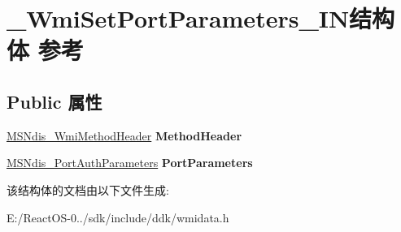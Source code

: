 \hypertarget{struct___wmi_set_port_parameters___i_n}{}\section{\+\_\+\+Wmi\+Set\+Port\+Parameters\+\_\+\+I\+N结构体 参考}
\label{struct___wmi_set_port_parameters___i_n}
\subsection*{Public 属性}
\begin{DoxyCompactItemize}
\item 
\mbox{\label{struct___wmi_set_port_parameters___i_n_a1abd5f32d794908f6052f43262f846f6}} 
\hyperlink{struct___m_s_ndis___wmi_method_header}{M\+S\+Ndis\+\_\+\+Wmi\+Method\+Header} {\bfseries Method\+Header}
\item 
\mbox{\label{struct___wmi_set_port_parameters___i_n_a68fb0b4f28967a8a907d75d5af6d3f55}} 
\hyperlink{struct___m_s_ndis___port_auth_parameters}{M\+S\+Ndis\+\_\+\+Port\+Auth\+Parameters} {\bfseries Port\+Parameters}
\end{DoxyCompactItemize}


该结构体的文档由以下文件生成\+:\begin{DoxyCompactItemize}
\item 
E\+:/\+React\+O\+S-\/0../sdk/include/ddk/wmidata.\+h\end{DoxyCompactItemize}
